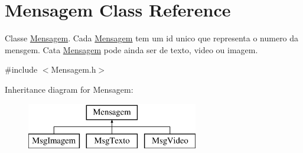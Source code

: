 \hypertarget{class_mensagem}{}\section{Mensagem Class Reference}
\label{class_mensagem}


Classe \hyperlink{class_mensagem}{Mensagem}. Cada \hyperlink{class_mensagem}{Mensagem} tem um id unico que representa o numero da mensgem. Cata \hyperlink{class_mensagem}{Mensagem} pode ainda ser de texto, video ou imagem.  




{\ttfamily \#include $<$Mensagem.\+h$>$}

Inheritance diagram for Mensagem\+:\begin{figure}[H]
\begin{center}
\leavevmode
\includegraphics[height=2.000000cm]{class_mensagem}
\end{center}
\end{figure}
